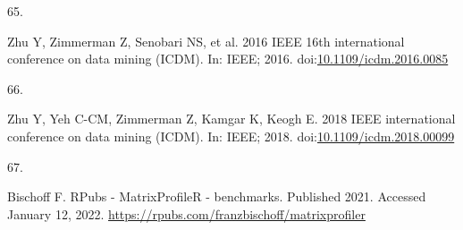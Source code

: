 \documentclass[12pt,twoside]{fmupthesis}
\newlength{\csllabelwidth}
\newlength{\cslhangindent}
\newenvironment{CSLReferences}[2] %
 {%
  \setlength{\parindent}{0pt}
  \ifodd #1 \everypar{\setlength{\hangindent}{\cslhangindent}}\ignorespaces\fi
  \ifnum #2 > 0
  \setlength{\parskip}{#2\baselineskip}
  \fi
 }%
 {}
\newcommand{\CSLLeftMargin}[1]{\parbox[t]{\csllabelwidth}{#1}}
\newcommand{\CSLRightInline}[1]{\parbox[t]{\linewidth - \csllabelwidth}{#1}}
\begin{document}
\begin{CSLReferences}{0}{0}
\leavevmode{}%
\CSLLeftMargin{65. }
\CSLRightInline{Zhu Y, Zimmerman Z, Senobari NS, et al. 2016 IEEE 16th international conference on data mining (ICDM). In: IEEE; 2016. doi:\href{https://doi.org/10.1109/icdm.2016.0085}{10.1109/icdm.2016.0085}}

\leavevmode{}%
\CSLLeftMargin{66. }
\CSLRightInline{Zhu Y, Yeh C-CM, Zimmerman Z, Kamgar K, Keogh E. 2018 IEEE international conference on data mining (ICDM). In: IEEE; 2018. doi:\href{https://doi.org/10.1109/icdm.2018.00099}{10.1109/icdm.2018.00099}}

\leavevmode{}%
\CSLLeftMargin{67. }
\CSLRightInline{Bischoff F. RPubs - MatrixProfileR - benchmarks. Published 2021. Accessed January 12, 2022. \url{https://rpubs.com/franzbischoff/matrixprofiler}}

\end{CSLReferences}

\end{document}
